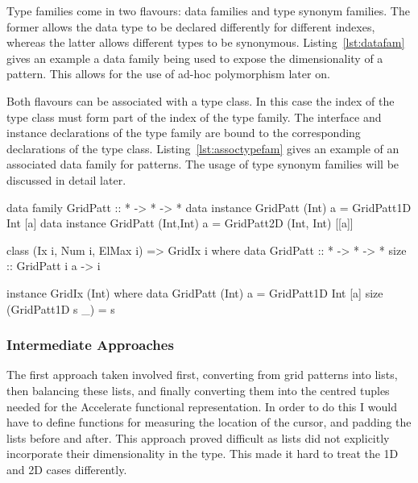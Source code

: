 \documentclass[12pt,a4paper,twoside]{scrbook}
\begin{document}
Type families come in two flavours: data families and type synonym families. The
former allows the data type to be declared differently for different indexes,
whereas the latter allows different types to be synonymous.
Listing~\ref{lst:datafam} gives an example a data family being used to expose
the dimensionality of a pattern. This allows for the use of ad-hoc polymorphism
later on.

Both flavours can be associated with a type class. In this case the index of the
type class must form part of the index of the type family. The interface and
instance declarations of the type family are bound to the corresponding
declarations of the type class. Listing~\ref{lst:assoctypefam} gives an example
of an associated data family for patterns. The usage of type synonym families
will be discussed in detail later.

\begin{hflisting}[label=lst:datafam, caption=The data family declares two
  different constructors for 1D and 2D lists. The dimensionality of the list is
  exposed in the type.]

data family GridPatt :: * -> * -> *
data instance GridPatt (Int) a =
    GridPatt1D Int [a]
data instance GridPatt (Int,Int) a =
    GridPatt2D (Int, Int) [[a]]

\end{hflisting}

\begin{hflisting}[label=lst:assoctypefam, caption={The data family from
    listing~\ref{lst:datafam} has now been associated with the class
    \texttt{GridIx} to provide the function \texttt{size} for various
    dimensionalities.}]

class (Ix i, Num i, ElMax i) => GridIx i where
    data GridPatt :: * -> * -> *
    size :: GridPatt i a -> i

instance GridIx (Int) where
    data GridPatt (Int) a = GridPatt1D Int [a]
    size (GridPatt1D s _) = s

\end{hflisting}

\subsubsection{Intermediate Approaches}

The first approach taken involved first, converting from grid patterns into
lists, then balancing these lists, and finally converting them into the centred
tuples needed for the Accelerate functional representation. In order to do this
I would have to define functions for measuring the location of the cursor, and
padding the lists before and after. This approach proved difficult as lists did
not explicitly incorporate their dimensionality in the type. This made it hard
to treat the 1D and 2D cases differently.
\end{document}

